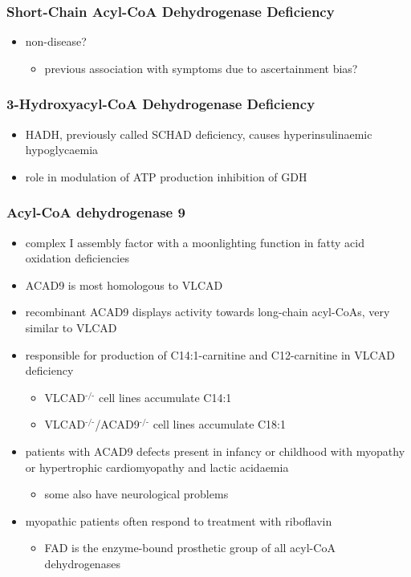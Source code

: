 \documentclass{scrartcl}
\begin{document}
\subsubsection{Short-Chain Acyl-CoA Dehydrogenase Deficiency}
\label{sec:org30552b5}
\begin{itemize}
\item non-disease?
\begin{itemize}
\item previous association with symptoms due to ascertainment bias?
\end{itemize}
\end{itemize}

\subsubsection{3-Hydroxyacyl-CoA Dehydrogenase Deficiency}
\label{sec:orgacaf58e}
\begin{itemize}
\item HADH, previously called SCHAD deficiency, causes hyperinsulinaemic
hypoglycaemia
\item role in modulation of ATP production inhibition of GDH
\end{itemize}

\subsubsection{Acyl-CoA dehydrogenase 9}
\label{sec:org2c1138b}
\begin{itemize}
\item complex I assembly factor with a moonlighting function in fatty
acid oxidation deficiencies
\item ACAD9 is most homologous to VLCAD
\item recombinant ACAD9 displays activity towards long-chain acyl-CoAs,
very similar to VLCAD
\item responsible for production of C14:1-carnitine and C12-carnitine in
VLCAD deficiency
\begin{itemize}
\item VLCAD\(^{\text{-/-}}\) cell lines accumulate C14:1
\item VLCAD\(^{\text{-/-}}\)/ACAD9\(^{\text{-/-}}\) cell lines accumulate C18:1
\end{itemize}
\item patients with ACAD9 defects present in infancy or childhood with
myopathy or hypertrophic cardiomyopathy and lactic acidaemia
\begin{itemize}
\item some also have neurological problems
\end{itemize}
\item myopathic patients often respond to treatment with riboflavin
\begin{itemize}
\item FAD is the enzyme-bound prosthetic group of all acyl-CoA
dehydrogenases
\end{itemize}
\end{itemize}
\end{document}
